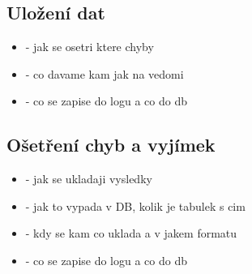 \subsection{Uložení dat}
\begin{itemize}
\item - jak se osetri ktere chyby
\item - co davame kam jak na vedomi
\item - co se zapise do logu a co do db
\end{itemize}

\subsection{Ošetření chyb a vyjímek}
\begin{itemize}
\item - jak se ukladaji vysledky
\item - jak to vypada v DB, kolik je tabulek s cim
\item - kdy se kam co uklada a v jakem formatu
\item - co se zapise do logu a co do db
\end{itemize}











